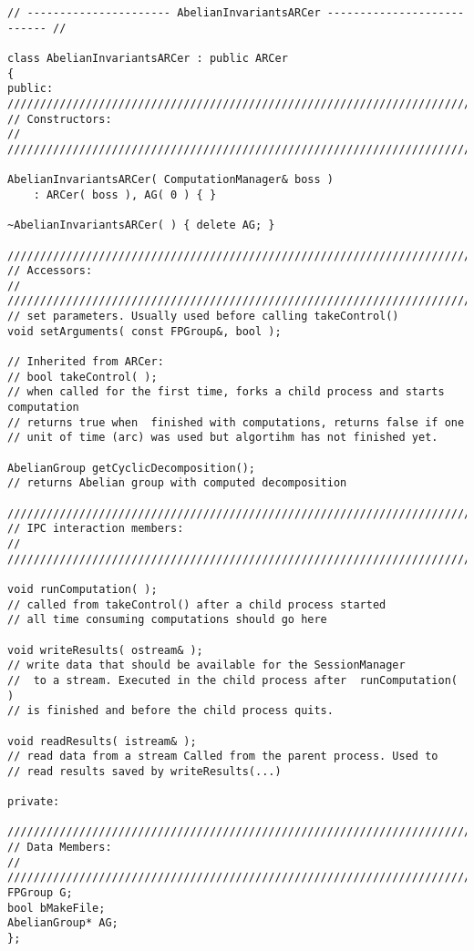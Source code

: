 \documentclass[12pt]{article}
\begin{document}
\footnotesize
\begin{verbatim}
// ---------------------- AbelianInvariantsARCer --------------------------- //

class AbelianInvariantsARCer : public ARCer
{
public:
////////////////////////////////////////////////////////////////////////
// Constructors:                                                      //
////////////////////////////////////////////////////////////////////////

AbelianInvariantsARCer( ComputationManager& boss )
    : ARCer( boss ), AG( 0 ) { }

~AbelianInvariantsARCer( ) { delete AG; }

/////////////////////////////////////////////////////////////////////////
// Accessors:                                                          //
/////////////////////////////////////////////////////////////////////////
// set parameters. Usually used before calling takeControl()
void setArguments( const FPGroup&, bool );

// Inherited from ARCer:
// bool takeControl( );
// when called for the first time, forks a child process and starts
computation
// returns true when  finished with computations, returns false if one
// unit of time (arc) was used but algortihm has not finished yet.

AbelianGroup getCyclicDecomposition();
// returns Abelian group with computed decomposition

/////////////////////////////////////////////////////////////////////////
// IPC interaction members:                                            //
/////////////////////////////////////////////////////////////////////////

void runComputation( );
// called from takeControl() after a child process started
// all time consuming computations should go here

void writeResults( ostream& );
// write data that should be available for the SessionManager
//  to a stream. Executed in the child process after  runComputation( )
// is finished and before the child process quits.

void readResults( istream& );
// read data from a stream Called from the parent process. Used to
// read results saved by writeResults(...)

private:

/////////////////////////////////////////////////////////////////////////
// Data Members:                                                       //
/////////////////////////////////////////////////////////////////////////
FPGroup G;
bool bMakeFile;
AbelianGroup* AG;
};
\end{verbatim}
\normalsize
\end{document}
